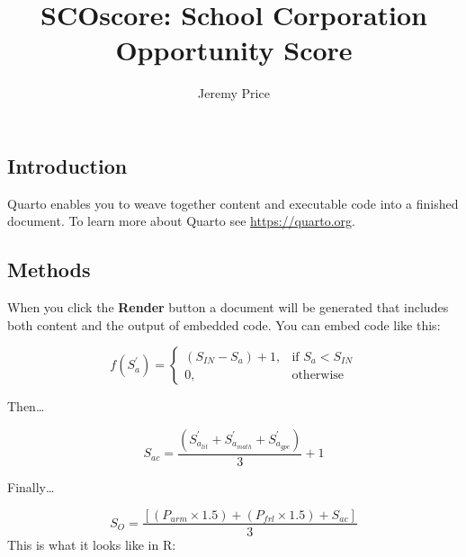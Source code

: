 \documentclass[
  letterpaper,
  DIV=11,
  numbers=noendperiod,
  oneside]{scrartcl}
\title{SCOscore: School Corporation Opportunity Score}
\author{Jeremy Price}
\date{}
\begin{document}
\maketitle
\ifdefined\Shaded\renewenvironment{Shaded}{\begin{tcolorbox}[borderline west={3pt}{0pt}{shadecolor}, boxrule=0pt, interior hidden, frame hidden, enhanced, sharp corners, breakable]}{\end{tcolorbox}}\fi

\hypertarget{introduction}{%
\subsection{Introduction}\label{introduction}}

Quarto enables you to weave together content and executable code into a
finished document. To learn more about Quarto see
\url{https://quarto.org}.

\hypertarget{methods}{%
\subsection{Methods}\label{methods}}

When you click the \textbf{Render} button a document will be generated
that includes both content and the output of embedded code. You can
embed code like this:

\[
f(S_a^\prime) = \begin{cases}
(S_{IN} - S_a) + 1, & \text{if } S_a < S_{IN} \\
0, &\text{otherwise}
\end{cases}
\]

Then\ldots{}

\[
S_{ac} = \frac{\left(S_{a_{lit}}^\prime + S_{a_{math}}^\prime + S_{a_{gpc}}^\prime\right)}{3} + 1
\]

Finally\ldots{}

\[
S_{O} = \frac{\left[\left(P_{urm} \times 1.5\right) + \left(P_{frl} \times 1.5\right) + S_{ac}\right]}{3}
\] This is what it looks like in R:
\end{document}
